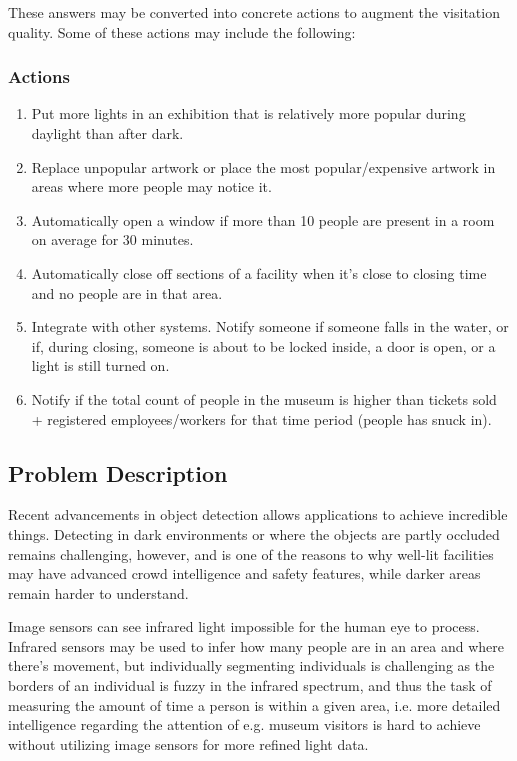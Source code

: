 These answers may be converted into concrete actions to augment the visitation quality. Some of these actions may include the following:
\subsubsection*{Actions}
\begin{enumerate}
    \item Put more lights in an exhibition that is relatively more popular during daylight than after dark.
    \item Replace unpopular artwork or place the most popular/expensive artwork in areas where more people may notice it.
    \item Automatically open a window if more than 10 people are present in a room on average for 30 minutes.
    \item Automatically close off sections of a facility when it's close to closing time and no people are in that area.    
    \item Integrate with other systems. Notify someone if someone falls in the water, or if, during closing, someone is about to be locked inside, a door is open, or a light is still turned on. 
    \item Notify if the total count of people in the museum is higher than tickets sold + registered employees/workers for that time period (people has snuck in).
\end{enumerate} 

\subsection{Problem Description}
Recent advancements in object detection allows applications to achieve incredible things. Detecting in dark environments or where the objects are partly occluded remains challenging, however, and is one of the reasons to why well-lit facilities may have advanced crowd intelligence and safety features, while darker areas remain harder to understand. 

Image sensors can see infrared light impossible for the human eye to process. Infrared sensors may be used to infer how many people are in an area and where there's movement, but individually segmenting individuals is challenging as the borders of an individual is fuzzy in the infrared spectrum, and thus the task of measuring the amount of time a person is within a given area, i.e. more detailed intelligence regarding the attention of e.g. museum visitors is hard to achieve without utilizing image sensors for more refined light data.

